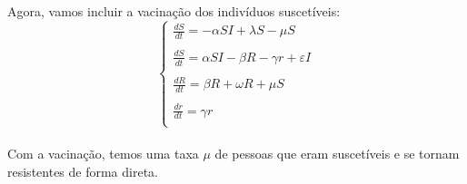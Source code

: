 \documentclass[a4paper]{article}
\begin{document}
\begin{enumerate}
Agora, vamos incluir a vacina\c{c}\~ao dos indiv\'iduos suscet\'iveis:
\\
\begin{equation}
\left\{\begin{array}{l}
\frac{dS}{dt} = -\alpha SI + \lambda S -\mu S\\
\\
\frac{dS}{dt} = \alpha SI - \beta R - \gamma r + \varepsilon I\\
\\
\frac{dR}{dt} = \beta R + \omega R + \mu S \\
\\
\frac{dr}{dt} = \gamma r \\
\end{array}
\end{equation}
\\
Com a vacina\c{c}\~ao, temos uma taxa $\mu$ de pessoas que eram suscet\'iveis e se tornam resistentes de forma direta.
\\


\end{enumerate}
\end{document}
